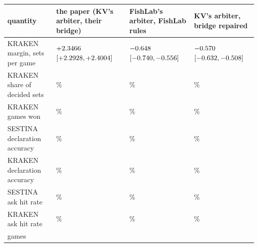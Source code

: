 \begin{tabularx}{\linewidth}{Q{1.0}Q{1.0}Q{1.0}Q{1.0}}
\toprule
quantity & the paper (KV's arbiter, their bridge) & FishLab's arbiter, FishLab rules & KV's arbiter, bridge repaired \\
\midrule
KRAKEN margin, sets per game & $+2.3466{}$ $[+2.2928{}, +2.4004{}]$ & $-0.648{}$ $[-0.740{}, -0.556{}]$ & $-0.570{}$ $[-0.632{}, -0.508{}]$ \\
KRAKEN share of decided sets & \kcMegaSetShare{}\% & \kcEDefaultSetShare{}\% & \kcVDealtBigSetShare{}\% \\
KRAKEN games won & \kcMegaWin{}\% & \kcEDefaultWin{}\% & \kcVDealtBigWin{}\% \\
SESTINA declaration accuracy & \kcMegaDeclS{}\% & \kcEDefaultDeclB{}\% & \kcVDealtBigDeclS{}\% \\
KRAKEN declaration accuracy & \kcMegaDeclKV{}\% & \kcEDefaultDeclA{}\% & \kcVDealtBigDeclKV{}\% \\
SESTINA ask hit rate & \kcMegaAskS{}\% & \kcEDefaultAskB{}\% & \kcVDealtBigAskS{}\% \\
KRAKEN ask hit rate & \kcMegaAskKV{}\% & \kcEDefaultAskA{}\% & \kcVDealtBigAskKV{}\% \\
games & \kcMegaN{} & \kcEDefaultGames{} & \kcVDealtBigGames{} \\
\bottomrule
\end{tabularx}
